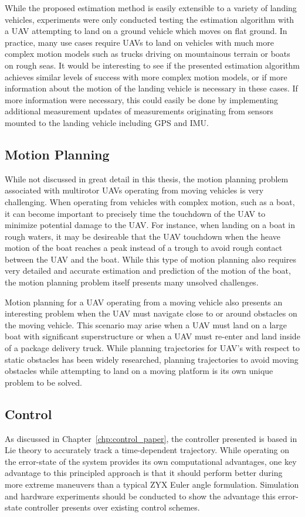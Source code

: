 While the proposed estimation method is easily extensible to a variety of
landing vehicles, experiments were only conducted testing the estimation
algorithm with a UAV attempting to land on a ground vehicle which moves on flat
ground. In practice, many use cases require UAVs to land on
vehicles with much more complex motion models such as trucks driving on
mountainous terrain or boats on rough seas.
It would be interesting to see if the presented estimation algorithm achieves
similar levels of success with more complex motion models, or if more
information about the motion of the landing vehicle is necessary in these cases.
If more information were necessary, this could easily be done by implementing
additional measurement updates of
measurements originating from sensors mounted to the landing vehicle including
GPS and IMU.

\subsection{Motion Planning}
While not discussed in great detail in this thesis, the motion planning problem
associated with multirotor UAVs operating from moving vehicles is very
challenging. When operating from vehicles with complex motion, such as a boat,
it can become important to precisely time the touchdown of the UAV to minimize
potential damage to the UAV. For instance, when landing on a boat in rough
waters, it may be desireable that the UAV touchdown when the heave motion of the
boat reaches a peak instead of a trough to avoid rough contact between the UAV
and the boat. While this type of motion planning also requires very detailed and
accurate estimation and prediction of the motion of the boat, the motion
planning problem itself presents many unsolved challenges.

Motion planning for a UAV operating from a moving vehicle also presents an
interesting problem when the UAV must navigate close to or around obstacles on
the moving vehicle. This scenario may arise when a UAV must land on a large boat
with significant superstructure or when a UAV must re-enter and land inside of a
package delivery truck. While planning trajectories for UAV's with respect to
static obstacles has been widely researched, planning trajectories to avoid
moving obstacles while attempting to land on a moving platform is its own unique
problem to be solved.

\subsection{Control}
As discussed in Chapter~\ref{chp:control_paper}, the controller presented is
based in Lie theory to accurately track a time-dependent trajectory. While
operating on the error-state of the system provides its own computational
advantages, one key advantage to this principled approach is that it should
perform better during more extreme maneuvers than a typical ZYX Euler angle
formulation. Simulation and hardware experiments should be conducted to show the
advantage this error-state controller presents over existing control schemes.

